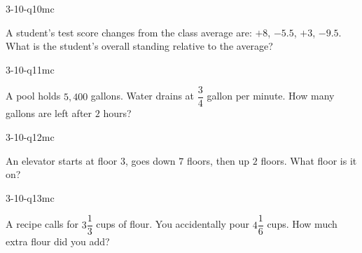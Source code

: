 \begin{practiceQuestion}{3-10-q10}{mc}
\begin{questionText}
A student's test score changes from the class average are: $+8$, $-5.5$, $+3$, $-9.5$. What is the student's overall standing relative to the average?
\end{questionText}
\end{practiceQuestion}

\begin{practiceQuestion}{3-10-q11}{mc}
\begin{questionText}
A pool holds $5{,}400$ gallons. Water drains at $\dfrac{3}{4}$ gallon per minute. How many gallons are left after $2$ hours?
\end{questionText}
\end{practiceQuestion}

\begin{practiceQuestion}{3-10-q12}{mc}
\begin{questionText}
An elevator starts at floor $3$, goes down $7$ floors, then up $2$ floors. What floor is it on?
\end{questionText}
\end{practiceQuestion}

\begin{practiceQuestion}{3-10-q13}{mc}
\begin{questionText}
A recipe calls for $3\dfrac{1}{3}$ cups of flour. You accidentally pour $4\dfrac{1}{6}$ cups. How much extra flour did you add?
\end{questionText}
\end{practiceQuestion}

